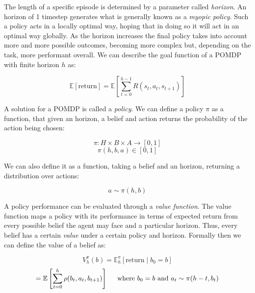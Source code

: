 The length of a specific episode is determined by a parameter called \textit{horizon}. An horizon of
1 timestep generates what is generally known as a \textit{myopic policy}. Such a policy acts in a
locally optimal way, hoping that in doing so it will act in an optimal way globally. As the horizon
increases the final policy takes into account more and more possible outcomes, becoming more complex
but, depending on the task, more performant overall. We can describe the goal function of a POMDP
with finite horizon $h$ as:

\begin{equation}
 \mathbb{E}[\text{return}] = \mathbb{E} \left [ \sum_{t=0}^{h-1} R(s_t, a_t, s_{t+1}) \right ]
\end{equation}

A solution for a POMDP is called a \textit{policy}. We can define a policy $\pi$ as a function, that
given an horizon, a belief and action returns the probability of the action being chosen:

\begin{equation}
 \pi : H \times B \times A \rightarrow [0,1]
\end{equation}
\begin{equation}
 \pi(h, b, a) \in [0,1]
\end{equation}

We can also define it as a function, taking a belief and an horizon, returning a distribution over
actions:

\begin{equation}
 a \sim \pi(h, b)
\end{equation}

A policy performance can be evaluated through a \textit{value function}. The value function maps a
policy with its performance in terms of expected return from every possible belief the agent may
face and a particular horizon. Thus, every belief has a certain \textit{value} under a certain
policy and horizon. Formally then we can define the value of a belief as:

\begin{equation}
 V^\pi_{h}(b) = \mathbb{E}^\pi_h \left [\text{return} \mid b_0 = b \right ]
\end{equation}
\begin{equation}
 = \mathbb{E} \left [\sum_{t=0}^{h} \rho(b_{t}, a_t, b_{t+1}) \right ]
    \hspace{0.5cm}\text{where }b_0 = b \text{ and }a_t \sim \pi(h-t, b_t)
\end{equation}

